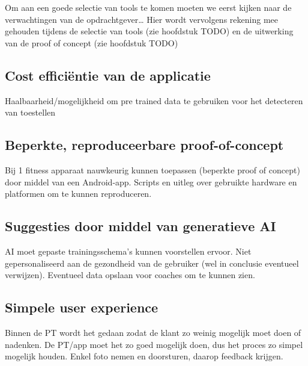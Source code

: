 
\chapter{}
\label{ch:requirements}
Om aan een goede selectie van tools te komen moeten we eerst kijken naar de verwachtingen van de opdrachtgever\ldots
Hier wordt vervolgens rekening mee gehouden tijdens de selectie van tools (zie hoofdstuk TODO) en de uitwerking van de proof of concept (zie hoofdstuk TODO)

\section{Cost efficiëntie van de applicatie}
\label{sec:cost-efficientie-van-de-applicatie}
Haalbaarheid/mogelijkheid om pre trained data te gebruiken voor het detecteren van toestellen

\section{Beperkte, reproduceerbare proof-of-concept}
\label{sec:beperkte-reproduceerbare-proof-of-concept}
Bij 1 fitness apparaat nauwkeurig kunnen toepassen (beperkte proof of concept) door middel van een Android-app.
Scripts en uitleg over gebruikte hardware en platformen om te kunnen reproduceren.

\section{Suggesties door middel van generatieve AI}
\label{sec:suggesties-door-middel-van-generatieve-ai}
AI moet gepaste trainingsschema's kunnen voorstellen ervoor.
Niet gepersonaliseerd aan de gezondheid van de gebruiker (wel in conclusie eventueel verwijzen).
Eventueel data opslaan voor coaches om te kunnen zien.

\section{Simpele user experience}
\label{sec:simpele-user-experience}
Binnen de PT wordt het gedaan zodat de klant zo weinig mogelijk moet doen of nadenken.
De PT/app moet het zo goed mogelijk doen, dus het proces zo simpel mogelijk houden.
Enkel foto nemen en doorsturen, daarop feedback krijgen.